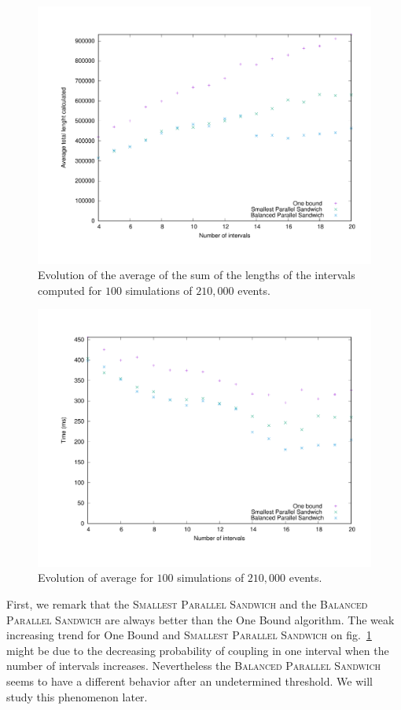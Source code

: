\documentclass[a4paper,10pt]{article}
\begin{document}
\begin{figure}[H]
\centering
\label{fig:interslong}
 \includegraphics[scale=0.45]{interslong.pdf}
 \caption{Evolution of the average of the sum of the lengths of the intervals computed for $100$ simulations of $210,000$ events.}
\end{figure}

\begin{figure}[H]
\centering
\label{fig:timelong}
 \includegraphics[scale=0.45]{timelong.pdf}
 \caption{Evolution of average for $100$ simulations of $210,000$ events.}
\end{figure}


First, we remark that the \textsc{Smallest Parallel Sandwich}  and the \textsc{Balanced Parallel Sandwich} are always better than the One Bound algorithm. The weak increasing trend for One Bound and \textsc{Smallest Parallel Sandwich} on fig.~\ref{fig:interslong} might be due to the decreasing probability of coupling in one interval when the number of intervals increases. Nevertheless the \textsc{Balanced Parallel Sandwich} seems to have a different behavior after an undetermined threshold. We will study this phenomenon later.
\end{document}
